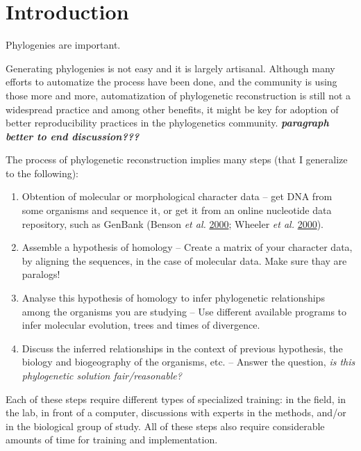 \documentclass[]{article}
\providecommand{\tightlist}{%
  \setlength{\itemsep}{0pt}\setlength{\parskip}{0pt}}
\begin{document}
\newpage

\hypertarget{introduction}{%
\section{Introduction}\label{introduction}}

Phylogenies are important.

Generating phylogenies is not easy and it is largely artisanal. Although many efforts to automatize the process have been done, and the community is using those more and more, automatization of phylogenetic reconstruction is still not a widespread practice and among other benefits, it might be key for adoption of better reproducibility practices in the phylogenetics community. \textbf{\emph{paragraph better to end discussion??? }}

The process of phylogenetic reconstruction implies many steps (that I generalize to the following):

\begin{enumerate}
\def\labelenumi{\arabic{enumi}.}
\tightlist
\item
  Obtention of molecular or morphological character data -- get DNA from some organisms
  and sequence it, or get it from an online nucleotide data repository, such as GenBank (Benson \emph{et al.} \protect\hyperlink{ref-benson2000genbank}{2000}; Wheeler \emph{et al.} \protect\hyperlink{ref-wheeler2000database}{2000}).
\item
  Assemble a hypothesis of homology -- Create a matrix of your character data, by
  aligning the sequences, in the case of molecular data. Make sure thay are paralogs!
\item
  Analyse this hypothesis of homology to infer phylogenetic relationships among
  the organisms you are studying -- Use different available programs to infer molecular
  evolution, trees and times of divergence.
\item
  Discuss the inferred relationships in the context of previous hypothesis, the
  biology and biogeography of the organisms, etc. -- Answer the question, \emph{is this phylogenetic solution fair/reasonable?}
\end{enumerate}

Each of these steps require different types of specialized training: in the field,
in the lab, in front of a computer, discussions with experts in the methods, and/or in the biological group of study.
All of these steps also require considerable amounts of time for training and implementation.
\end{document}
